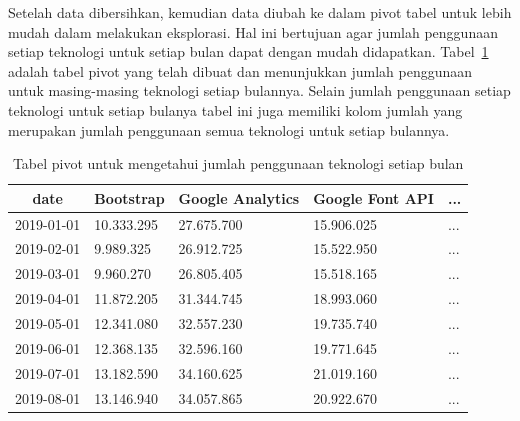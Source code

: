 Setelah data dibersihkan, kemudian data diubah ke dalam pivot tabel untuk lebih mudah dalam melakukan eksplorasi. Hal ini bertujuan agar jumlah penggunaan setiap teknologi untuk setiap bulan dapat dengan mudah didapatkan. Tabel~\ref{tab:tabelpivot} adalah tabel pivot yang telah dibuat dan menunjukkan jumlah penggunaan untuk masing-masing teknologi setiap bulannya. Selain jumlah penggunaan setiap teknologi untuk setiap bulanya tabel ini juga memiliki kolom jumlah yang merupakan jumlah penggunaan semua teknologi untuk setiap bulannya.

\begin{table}[H]
\centering
\caption{Tabel pivot untuk mengetahui jumlah penggunaan teknologi setiap bulan}
\label{tab:tabelpivot}
\begin{tabular}{lllll}
\hline
\multicolumn{1}{|c|}{date} & \multicolumn{1}{r|}{Bootstrap} & \multicolumn{1}{r|}{Google Analytics} & \multicolumn{1}{r|}{Google Font API} & \multicolumn{1}{r|}{...} \\ \hline
\multicolumn{1}{|l|}{2019-01-01} & \multicolumn{1}{l|}{10.333.295} & \multicolumn{1}{l|}{27.675.700} & \multicolumn{1}{l|}{15.906.025} & \multicolumn{1}{l|}{...} \\ \hline
\multicolumn{1}{|l|}{2019-02-01} & \multicolumn{1}{l|}{9.989.325} & \multicolumn{1}{l|}{26.912.725} & \multicolumn{1}{l|}{15.522.950} & \multicolumn{1}{l|}{...} \\ \hline
\multicolumn{1}{|l|}{2019-03-01} & \multicolumn{1}{l|}{9.960.270} & \multicolumn{1}{l|}{26.805.405} & \multicolumn{1}{l|}{15.518.165} & \multicolumn{1}{l|}{...} \\ \hline
\multicolumn{1}{|l|}{2019-04-01} & \multicolumn{1}{l|}{11.872.205} & \multicolumn{1}{l|}{31.344.745} & \multicolumn{1}{l|}{18.993.060} & \multicolumn{1}{l|}{...} \\ \hline
\multicolumn{1}{|l|}{2019-05-01} & \multicolumn{1}{l|}{12.341.080} & \multicolumn{1}{l|}{32.557.230} & \multicolumn{1}{l|}{19.735.740} & \multicolumn{1}{l|}{...} \\ \hline
\multicolumn{1}{|l|}{2019-06-01} & \multicolumn{1}{l|}{12.368.135} & \multicolumn{1}{l|}{32.596.160} & \multicolumn{1}{l|}{19.771.645} & \multicolumn{1}{l|}{...} \\ \hline
\multicolumn{1}{|l|}{2019-07-01} & \multicolumn{1}{l|}{13.182.590} & \multicolumn{1}{l|}{34.160.625} & \multicolumn{1}{l|}{21.019.160} & \multicolumn{1}{l|}{...} \\ \hline
\multicolumn{1}{|l|}{2019-08-01} & \multicolumn{1}{l|}{13.146.940} & \multicolumn{1}{l|}{34.057.865} & \multicolumn{1}{l|}{20.922.670} & \multicolumn{1}{l|}{...} \\ \hline

\end{tabular}
\end{table}
